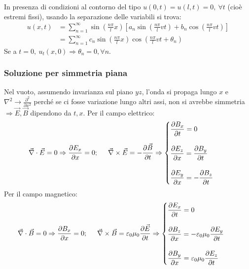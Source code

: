 \documentclass[10pt, a4paper]{scrartcl}
\numberwithin{equation}{subsection}
\theoremstyle{style1}
\begin{document}
In presenza di condizioni al contorno del tipo $u(0,t) = u(l,t) = 0, \ \forall t$ (cio\`e estremi fissi), usando la separazione delle variabili si trova:
\begin{equation}
	\begin{split}
		u (x,t) &= \sum_{n=1}^{\infty} \sin\left(\frac{n\pi}{l}x\right) \left[ a_n \sin\left(\frac{n\pi}{l}vt\right) + b_n   \cos \left(\frac{n\pi}{l}vt\right) \right] \\
		&= \sum_{n=1}^{\infty} c_n \sin\left(\frac{n\pi}{l}x\right) \cos \left(\frac{n\pi}{l}vt + \theta _n\right) 
	\end{split}
\end{equation}
Se a $t=0, \ u_t (x,0)\Rightarrow \theta _n=0, \forall n$.


\subsubsection{Soluzione per simmetria piana}
Nel vuoto, assumendo invarianza sul piano $yz$, l'onda si propaga lungo $x$ e $\nabla^2 \to \frac{\partial^2 }{\partial x^2} $ perch\'e se ci fosse variazione lungo altri assi, non si avrebbe simmetria $\Rightarrow \vec{E},\vec{B}$ dipendono da $t,x$. Per il campo elettrico:
\begin{equation}
	\begin{split}
		&\vec{\nabla }\cdot \vec{E}=0 \Rightarrow \frac{\partial E_x}{\partial x} =0; \hspace{.5cm} \vec{\nabla }\times \vec{E}= - \frac{\partial \vec{B}}{\partial t} \Rightarrow \begin{cases}
			\displaystyle \frac{\partial B_x}{\partial t} = 0\\
			\\
			\displaystyle \frac{\partial E_z}{\partial x} = \frac{\partial B_y}{\partial t} \\
			\\
			\displaystyle \frac{\partial E_y}{\partial x} =- \frac{\partial B_z}{\partial t} 
		\end{cases}
	\end{split}
\end{equation}
Per il campo magnetico:
\begin{equation}
	\begin{split}
		&\vec{\nabla }\cdot \vec{B} = 0\Rightarrow \frac{\partial B_x}{\partial x} =0; \hspace{.5cm} \vec{\nabla }\times \vec{B}= \varepsilon _0 \mu _0 \frac{\partial \vec{E}}{\partial t} \Rightarrow \begin{cases}
			\displaystyle \frac{\partial E_x}{\partial t} =0\\
			\\
			\displaystyle \frac{\partial B_z}{\partial x} =-\varepsilon _0\mu _0 \frac{\partial E_y}{\partial t} \\
			\\
			\displaystyle \frac{\partial B_y}{\partial x} = \varepsilon _0 \mu _0 \frac{\partial E_z}{\partial t} 
		\end{cases}
	\end{split}
\end{equation}
\end{document}
